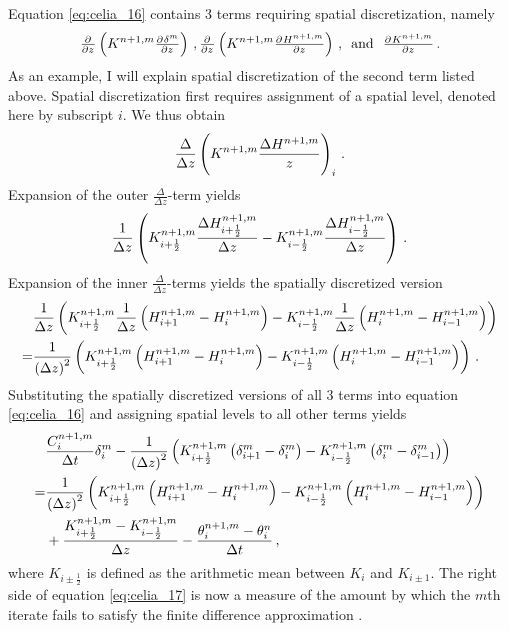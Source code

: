 Equation \eqref{eq:celia_16} contains 3 terms requiring spatial discretization, namely
\begin{equation*}
  \pd{}{z} \del{ K^{n+1,m} \pd{\delta^m}{z} } \, , \pd{}{z} \del{ K^{n+1,m} \pd{H^{n+1,m}}{z} } \, , \, \text{ and } \, \, \pd{K^{n+1,m}}{z} \, .
\end{equation*}
As an example, I will explain spatial discretization of the second term listed above.  Spatial discretization first requires assignment of a spatial level, denoted here by subscript $i$.  We thus obtain
\begin{equation*}
  \frac{\Delta}{\Delta z} \del{ K^{n+1,m}\frac{\Delta H^{n+1,m}}{z} }_i \, .
\end{equation*}
Expansion of the outer $\frac{\Delta}{\Delta z}$-term yields
\begin{equation*}
  \frac{1}{\Delta z} \del{ K_{i+\frac{1}{2}}^{n+1,m}\frac{\Delta H_{i+\frac{1}{2}}^{n+1,m}}{\Delta z} - K_{i-\frac{1}{2}}^{n+1,m}\frac{\Delta H_{i-\frac{1}{2}}^{n+1,m}}{\Delta z} } \, .
\end{equation*}
Expansion of the inner $\frac{\Delta}{\Delta z}$-terms yields the spatially discretized version
\begin{align*}
  &\frac{1}{\Delta z} \del{ K_{i+\frac{1}{2}}^{n+1,m}\frac{1}{\Delta z} \del{ H_{i+1}^{n+1,m} - H_{i}^{n+1,m} } - K_{i-\frac{1}{2}}^{n+1,m}\frac{1}{\Delta z} \del{ H_{i}^{n+1,m} - H_{i-1}^{n+1,m} } } \\
  = &\frac{1}{\del{ \Delta z }^2} \del{ K_{i+\frac{1}{2}}^{n+1,m} \del{ H_{i+1}^{n+1,m} - H_{i}^{n+1,m} } - K_{i-\frac{1}{2}}^{n+1,m} \del{ H_{i}^{n+1,m} - H_{i-1}^{n+1,m} } } \, .
\end{align*}
Substituting the spatially discretized versions of all 3 terms into equation \eqref{eq:celia_16} and assigning spatial levels to all other terms yields \parencite{celia_general_1990}
\begin{equation}
  \label{eq:celia_17}
  \begin{split}
    &\frac{C_i^{n+1,m}}{\Delta t}\delta_i^m - \frac{1}{\del{ \Delta z }^2} \del{ K_{i+\frac{1}{2}}^{n+1,m} \del{ \delta_{i+1}^{m} - \delta_{i}^{m} } - K_{i-\frac{1}{2}}^{n+1,m} \del{ \delta_{i}^{m} - \delta_{i-1}^{m} } } \\
    = &\frac{1}{\del{ \Delta z }^2} \del{ K_{i+\frac{1}{2}}^{n+1,m} \del{ H_{i+1}^{n+1,m} - H_{i}^{n+1,m} } - K_{i-\frac{1}{2}}^{n+1,m} \del{ H_{i}^{n+1,m} - H_{i-1}^{n+1,m} } } \\
    &+ \frac{K_{i+\frac{1}{2}}^{n+1,m} - K_{i-\frac{1}{2}}^{n+1,m}}{\Delta z} - \frac{\theta_i^{n+1,m} - \theta_i^{n}}{\Delta t} \, ,
  \end{split}
\end{equation}
where $K_{i\pm\frac{1}{2}}$ is defined as the arithmetic mean between $K_i$ and $K_{i\pm1}$.  The right side of equation \eqref{eq:celia_17} is now a measure of the amount by which the $m$th iterate fails to satisfy the finite difference approximation \parencite{celia_general_1990}.

